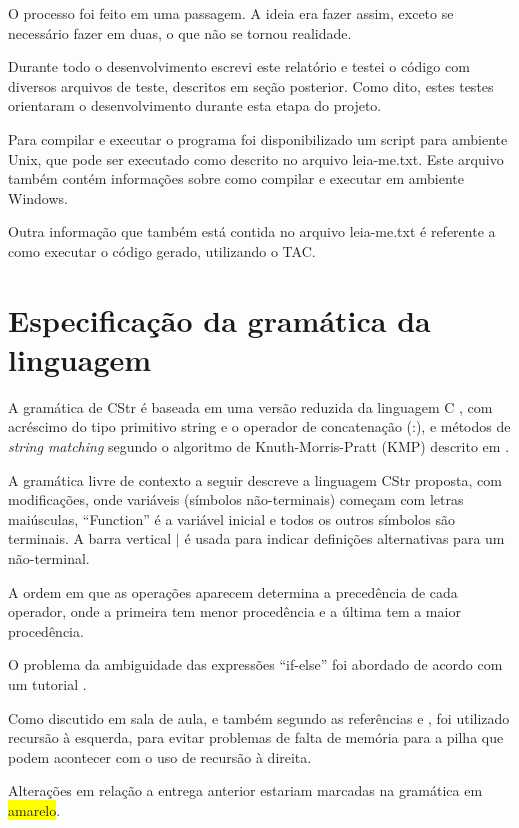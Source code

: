 \documentclass[12pt]{article}
\begin{document}
O processo foi feito em uma passagem. A ideia era fazer assim, exceto se necessário fazer em duas, o que não se tornou realidade.

Durante todo o desenvolvimento escrevi este relatório e testei o código com diversos arquivos de teste, descritos em seção posterior. Como dito, estes testes orientaram o desenvolvimento durante esta etapa do projeto.

Para compilar e executar o programa foi disponibilizado um script para ambiente Unix, que pode ser executado como descrito no arquivo leia-me.txt. Este arquivo também contém informações sobre como compilar e executar em ambiente Windows.

Outra informação que também está contida no arquivo leia-me.txt é referente a como executar o código gerado, utilizando o TAC.

\section{Especificação da gramática da linguagem}

\indent

A gramática de CStr é baseada em uma versão reduzida da linguagem C \cite{minic}, com acréscimo do tipo primitivo string e o operador de concatenação (:), e métodos de \textit{string matching} segundo o algoritmo de Knuth-Morris-Pratt (KMP) descrito em \cite{clrs09}.

A gramática livre de contexto a seguir descreve a linguagem CStr proposta, com modificações, onde variáveis (símbolos não-terminais) começam com letras maiúsculas, ``Function'' é a variável inicial e todos os outros símbolos são terminais. A barra vertical $|$ é usada para indicar definições alternativas para um não-terminal.

A ordem em que as operações aparecem determina a precedência de cada operador, onde a primeira tem menor procedência e a última tem a maior procedência.

O problema da ambiguidade das expressões ``if-else'' foi abordado de acordo com um tutorial \cite{lexeyacctutorial}.

Como discutido em sala de aula, e também segundo as referências \cite{aquamentus} e \cite{lexeyacctutorial}, foi utilizado recursão à esquerda, para evitar problemas de falta de memória para a pilha que podem acontecer com o uso de recursão à direita.

Alterações em relação a entrega anterior estariam marcadas na gramática em \colorbox{yellow}{amarelo}.
\end{document}
